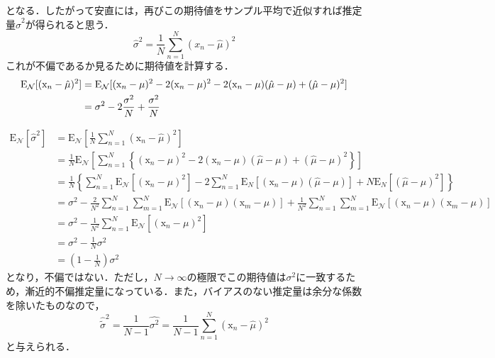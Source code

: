 \documentclass[a4paper,11pt]{jsreport}
\begin{document}
となる．したがって安直には，再びこの期待値をサンプル平均で近似すれば推定量$\hat{\sigma}^2$が得られると思う．
\begin{equation}
  \hat{\sigma}^2
  = \frac{1}{N} \sum_{n=1}^N (x_n - \hat{\mu})^2
\end{equation}
これが不偏であるか見るために期待値を計算する．
\begin{align}
  \mathrm{E}_{\mathcal{N}}[(\mathrm{x}_n - \hat{\mu})^2]
   & = \mathrm{E}_{\mathcal{N}}[(\mathrm{x}_n - \mu)^2 -2(\mathrm{x}_n - \mu)^2 - 2(\mathrm{x}_n - \mu)(\hat{\mu} - \mu) + (\hat{\mu} - \mu)^2] \notag \\
   & = \sigma^2 -2 \frac{\sigma^2}{N} + \frac{\sigma^2}{N}
\end{align}

\begin{align*}
  \mathrm{E}_\mathcal{N}\left[\hat{\sigma}^2\right]
   & =\mathrm{E}_\mathcal{N}\left[\frac{1}{N} \sum_{n=1}^N\left(\mathrm{x}_n-\hat{\mu}\right)^2\right]                                                                                                                                       \\
   & =\frac{1}{N} \mathrm{E}_\mathcal{N}\left[\sum_{n=1}^N\left\{\left(\mathrm{x}_n-\mu\right)^2-2\left(\mathrm{x}_n-\mu\right)(\hat{\mu}-\mu)+(\hat{\mu}-\mu)^2\right\}\right]                                                                       \\
   & =\frac{1}{N}\left\{\sum_{n=1}^N \mathrm{E}_\mathcal{N}\left[\left(\mathrm{x}_n-\mu\right)^2\right]-2 \sum_{n=1}^N \mathrm{E}_N\left[\left(\mathrm{x}_n-\mu\right)(\hat{\mu}-\mu)\right]+N \mathrm{E}_N\left[(\hat{\mu}-\mu)^2\right]\right\}                       \\
   & =\sigma^2-\frac{2}{N^2} \sum_{n=1}^N \sum_{m=1}^N \mathrm{E}_\mathcal{N}\left[\left(\mathrm{x}_n-\mu\right)\left(\mathrm{x}_m-\mu\right)\right]+\frac{1}{N^2} \sum_{n=1}^N \sum_{m=1}^N \mathrm{E}_\mathcal{N}\left[\left(\mathrm{x}_n-\mu\right)\left(\mathrm{x}_m-\mu\right)\right] \\
   & =\sigma^2-\frac{1}{N^2} \sum_{n=1}^N \mathrm{E}_\mathcal{N}\left[\left(\mathrm{x}_n-\mu\right)^2\right]                                                                                                                                 \\
   & =\sigma^2-\frac{1}{N} \sigma^2                                                                                                                                                                              \\
   & =\left(1-\frac{1}{N}\right) \sigma^2
\end{align*}
となり，不偏ではない．ただし，$N \rightarrow \infty$の極限でこの期待値は$\sigma^2$に一致するため，漸近的不偏推定量になっている．また，バイアスのない推定量は余分な係数を除いたものなので，
\begin{equation}
  \hat{\tilde{\sigma}}^2 
  = \frac{1}{N - 1} \hat{\sigma^2} = \frac{1}{N - 1} \sum_{n=1}^N (\mathrm{x}_n - \hat{\mu})^2
\end{equation}
と与えられる．
\end{document}
